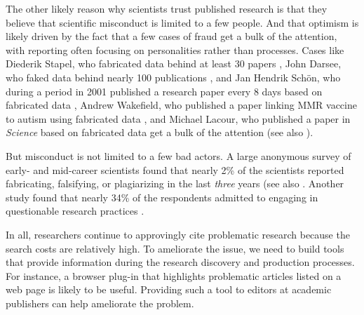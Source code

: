 \documentclass[12pt]{article}
\begin{document}
The other likely reason why scientists trust published research is that they believe that scientific misconduct is limited to a few people. And that optimism is likely driven by the fact that a few cases of fraud get a bulk of the attention, with reporting often focusing on personalities rather than processes. Cases like Diederik Stapel, who fabricated data behind at least 30 papers \cite{levelt2012flawed}, John Darsee, who faked data behind nearly 100 publications \cite{stewart1987integrity, anderson2013research, wallis1983fraud}, and Jan Hendrik Sch{\"o}n, who during a period in 2001 published a research paper every 8 days based on fabricated data \cite{service2003scientific, anderson2013research}, Andrew Wakefield, who published a paper linking MMR vaccine to autism using fabricated data \cite{wakefield1998retracted, deer2011case, godlee2011wakefield}, and Michael Lacour, who published a paper in \textit{Science} based on fabricated data \cite{broockman2015irregularities, mcnutt2015editorial} get a bulk of the attention (see also \cite{basu2006they, anderson2013research}).

But misconduct is not limited to a few bad actors. A large anonymous survey of early- and mid-career scientists found that nearly 2\% of the scientists reported fabricating, falsifying, or plagiarizing in the last \textit{three} years \cite{martinson2005scientists} (see also \cite{titus2008repairing}. Another study found that nearly 34\% of the respondents admitted to engaging in questionable research practices \cite{fanelli2009many}.

In all, researchers continue to approvingly cite problematic research because the search costs are relatively high. To ameliorate the issue, we need to build tools that provide information during the research discovery and production processes. For instance, a browser plug-in that highlights problematic articles listed on a web page is likely to be useful. Providing such a tool to editors at academic publishers can help ameliorate the problem.

\clearpage

\end{document}
